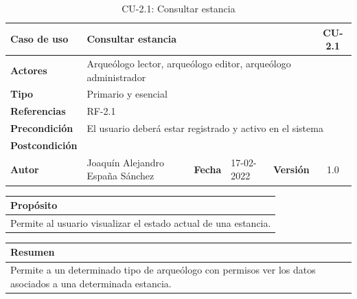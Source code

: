     \begin{table}[H]
    \begin{center}
        \begin{adjustbox}{width=\textwidth}
        \begin{tabular}{ | l | l | l | l | c | c | } 
            \hline
            \textbf{Caso de uso} & \multicolumn{4}{l|}{Consultar estancia} & \cellcolor{gray!50} \textbf{CU-2.1}\\
            \hline
            \textbf{Actores} & \multicolumn{5}{p{0.9\linewidth}|}{Arqueólogo lector, arqueólogo editor, arqueólogo administrador} \\
            \hline
            \textbf{Tipo} & \multicolumn{5}{l|}{Primario y esencial} \\
            \hline
            \textbf{Referencias} & \multicolumn{3}{l|}{RF-2.1} & \multicolumn{2}{l|}{ }\\
            \hline
            \textbf{Precondición} & \multicolumn{5}{l|}{El usuario deberá estar registrado y activo en el sistema} \\
            \hline
            \textbf{Postcondición} & \multicolumn{5}{l|}{ } \\
            \hline
            \textbf{Autor} & \multicolumn{1}{p{0.25\linewidth}|}{Joaquín Alejandro España Sánchez} & \textbf{Fecha} & 
            17-02-2022     & \textbf{Versión}                                                      & 1.0\\
            \hline
        \end{tabular}
        \end{adjustbox}
        \caption{CU-2.1: Consultar estancia}
        \label{tab:consult-room}
    \end{center}
    \end{table}

    \begin{table}[H]
        \centering
        \begin{tabularx}{\textwidth}{@{} |L |@{}} \hline
            \textbf{Propósito} \\
            \hline
            Permite al usuario visualizar el estado actual de una estancia. \\
            \hline
        \end{tabularx}
    \end{table}

    \begin{table}[H]
        \centering
        \begin{tabularx}{\textwidth}{@{} |L |@{}} \hline
            \textbf{Resumen} \\
            \hline
            Permite a un determinado tipo de arqueólogo con permisos ver los datos asociados
            a una determinada estancia. \\
            \hline
        \end{tabularx}
    \end{table}

